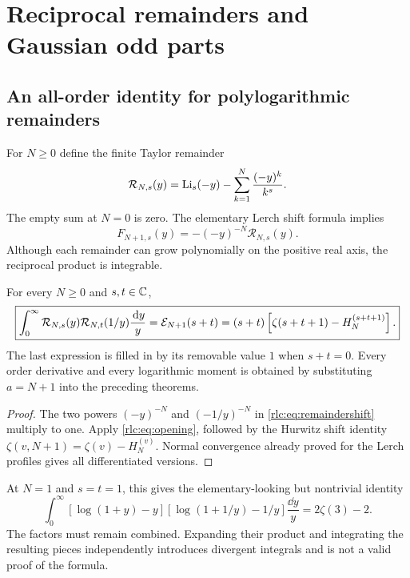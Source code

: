 \section{Reciprocal remainders and Gaussian odd parts}
\label{rlc:sec:harmonic}

\subsection{An all-order identity for polylogarithmic remainders}
For $N\ge0$ define the finite Taylor remainder
\begin{equation}\label{rlc:eq:remainderdef}
 \mathcal R_{N,s}(y)=\operatorname{Li}_s(-y)-\sum_{k=1}^{N}\frac{(-y)^k}{k^s}.
\end{equation}
The empty sum at $N=0$ is zero. The elementary Lerch shift formula
implies
\begin{equation}\label{rlc:eq:remaindershift}
 F_{N+1,s}(y)=-(-y)^{-N}\mathcal R_{N,s}(y).
\end{equation}
Although each remainder can grow polynomially on the positive real
axis, the reciprocal product is integrable.

\begin{corollary}
\label{rlc:cor:remainders}
For every $N\ge0$ and $s,t\in\mathbb C$,
\begin{equation}\label{rlc:eq:remainderidentity}
 \boxed{\displaystyle
 \int_0^\infty\mathcal R_{N,s}(y)\mathcal R_{N,t}(1/y)
                  \frac{\,\mathrm d y}{y}
 =\mathcal E_{N+1}(s+t)
 =(s+t)\left[\zeta(s+t+1)-H_N^{(s+t+1)}\right].}
\end{equation}
The last expression is filled in by its removable value $1$ when
$s+t=0$. Every order derivative and every logarithmic moment is obtained
by substituting $a=N+1$ into the preceding theorems.
\end{corollary}
\begin{proof}
The two powers $(-y)^{-N}$ and $(-1/y)^{-N}$ in
\eqref{rlc:eq:remaindershift} multiply to one. Apply
\eqref{rlc:eq:opening}, followed by the Hurwitz shift identity
$\zeta(v,N+1)=\zeta(v)-H_N^{(v)}$. Normal convergence already proved
for the Lerch profiles gives all differentiated versions.
\end{proof}

At $N=1$ and $s=t=1$, this gives the elementary-looking but nontrivial
identity
\begin{equation}\label{rlc:eq:remainderexample}
 \int_0^\infty
 [\log(1+y)-y][\log(1+1/y)-1/y]\frac{\dd y}{y}
       =2\zeta(3)-2.
\end{equation}
The factors must remain combined. Expanding their product and
integrating the resulting pieces independently introduces divergent
integrals and is not a valid proof of the formula.

